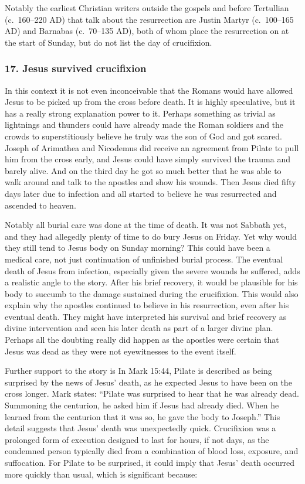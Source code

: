 Notably the earliest Christian writers outside the gospels and before Tertullian (c.~160--220 AD) that talk about the resurrection are Justin Martyr (c.~100--165 AD) and Barnabas (c.~70--135 AD), both of whom place the resurrection on at the start of Sunday, but do not list the day of crucifixion.

\subsubsection{17.
Jesus survived crucifixion}\label{subsubsec:jesus-survived-crucifixion}

In this context it is not even inconceivable that the Romans would have allowed Jesus to be picked up from the cross before death.
It is highly speculative, but it has a really strong explanation power to it.
Perhaps something as trivial as lightnings and thunders could have already made the Roman soldiers and the crowds to superstitiously believe he truly was the son of God and got scared.
Joseph of Arimathea and Nicodemus did receive an agreement from Pilate to pull him from the cross early, and Jesus could have simply survived the trauma and barely alive.
And on the third day he got so much better that he was able to walk around and talk to the apostles and show his wounds.
Then Jesus died fifty days later due to infection and all started to believe he was resurrected and ascended to heaven.

Notably all burial care was done at the time of death.
It was not Sabbath yet, and they had allegedly plenty of time to do bury Jesus on Friday.
Yet why would they still tend to Jesus body on Sunday morning?
This could have been a medical care, not just continuation of unfinished burial process.
The eventual death of Jesus from infection, especially given the severe wounds he suffered, adds a realistic angle to the story.
After his brief recovery, it would be plausible for his body to succumb to the damage sustained during the crucifixion.
This would also explain why the apostles continued to believe in his resurrection, even after his eventual death.
They might have interpreted his survival and brief recovery as divine intervention and seen his later death as part of a larger divine plan.
Perhaps all the doubting really did happen as the apostles were certain that Jesus was dead as they were not eyewitnesses to the event itself.

Further support to the story is In Mark 15:44, Pilate is described as being surprised by the news of Jesus' death, as he expected Jesus to have been on the cross longer.
Mark states: ``Pilate was surprised to hear that he was already dead.
Summoning the centurion, he asked him if Jesus had already died.
When he learned from the centurion that it was so, he gave the body to Joseph.'' This detail suggests that Jesus' death was unexpectedly quick.
Crucifixion was a prolonged form of execution designed to last for hours, if not days, as the condemned person typically died from a combination of blood loss, exposure, and suffocation.
For Pilate to be surprised, it could imply that Jesus' death occurred more quickly than usual, which is significant because:

